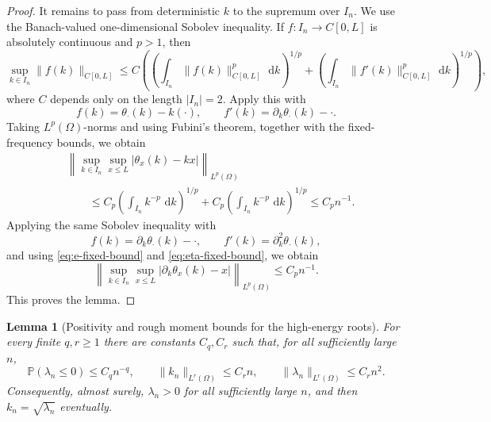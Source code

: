 \documentclass[11pt]{article}
\newtheorem{lemma}[theorem]{Lemma}
\newcommand{\dd}{\,\mathrm d}
\newcommand{\Prob}{\mathbb P}
\begin{document}
\begin{proof}
It remains to pass from deterministic $k$ to the supremum over $I_n$. We use the Banach-valued one-dimensional Sobolev inequality. If $f:I_n\to C[0,L]$ is absolutely continuous and $p>1$, then
\[
    \sup_{k\in I_n}\|f(k)\|_{C[0,L]}
    \le C
    \left(
      \left(\int_{I_n}\|f(k)\|_{C[0,L]}^p\,\dd k\right)^{1/p}
      +
      \left(\int_{I_n}\|f'(k)\|_{C[0,L]}^p\,\dd k\right)^{1/p}
    \right),
\]
where $C$ depends only on the length $|I_n|=2$. Apply this with
\[
    f(k)=\theta_\cdot(k)-k(\cdot),
    \qquad f'(k)=\partial_k\theta_\cdot(k)-\cdot.
\]
Taking $L^p(\Omega)$-norms and using Fubini's theorem, together with the fixed-frequency bounds, we obtain
\[
\begin{aligned}
&\left\|\sup_{k\in I_n}\sup_{x\le L}|\theta_x(k)-kx|\right\|_{L^p(\Omega)} \\
&\qquad \le C_p
    \left(\int_{I_n} k^{-p}\,\dd k\right)^{1/p}
    +C_p
    \left(\int_{I_n} k^{-p}\,\dd k\right)^{1/p}
    \le C_p n^{-1}.
\end{aligned}
\]
Applying the same Sobolev inequality with
\[
    f(k)=\partial_k\theta_\cdot(k)-\cdot,
    \qquad f'(k)=\partial_k^2\theta_\cdot(k),
\]
and using \eqref{eq:e-fixed-bound} and \eqref{eq:eta-fixed-bound}, we obtain
\[
    \left\|\sup_{k\in I_n}\sup_{x\le L}|\partial_k\theta_x(k)-x|\right\|_{L^p(\Omega)}
    \le C_p n^{-1}.
\]
This proves the lemma.
\end{proof}

\begin{lemma}[Positivity and rough moment bounds for the high-energy roots]\label{lem:rough-moment}
For every finite \(q,r\ge1\) there are constants \(C_q,C_r\) such that, for all sufficiently large \(n\),
\[
    \Prob(\lambda_n\le0)\le C_q n^{-q},
    \qquad
    \|k_n\|_{L^r(\Omega)}\le C_r n,
    \qquad
    \|\lambda_n\|_{L^r(\Omega)}\le C_r n^2 .
\]
Consequently, almost surely, \(\lambda_n>0\) for all sufficiently large \(n\), and then \(k_n=\sqrt{\lambda_n}\) eventually.
\end{lemma}
\end{document}
